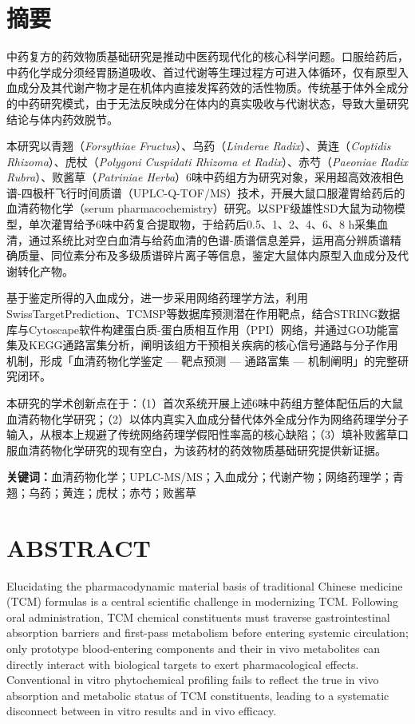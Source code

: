 \documentclass[12pt,a4paper,UTF8,openany]{ctexbook}
\begin{document}
\chapter*{摘\quad 要}

中药复方的药效物质基础研究是推动中医药现代化的核心科学问题。口服给药后，中药化学成分须经胃肠道吸收、首过代谢等生理过程方可进入体循环，仅有原型入血成分及其代谢产物才是在机体内直接发挥药效的活性物质。传统基于体外全成分的中药研究模式，由于无法反映成分在体内的真实吸收与代谢状态，导致大量研究结论与体内药效脱节。

本研究以青翘（\textit{Forsythiae Fructus}）、乌药（\textit{Linderae Radix}）、黄连（\textit{Coptidis Rhizoma}）、虎杖（\textit{Polygoni Cuspidati Rhizoma et Radix}）、赤芍（\textit{Paeoniae Radix Rubra}）、败酱草（\textit{Patriniae Herba}）6味中药组方为研究对象，采用超高效液相色谱-四极杆飞行时间质谱（UPLC-Q-TOF/MS）技术，开展大鼠口服灌胃给药后的血清药物化学（serum pharmacochemistry）研究。以SPF级雄性SD大鼠为动物模型，单次灌胃给予6味中药复合提取物，于给药后0.5、1、2、4、6、8 h采集血清，通过系统比对空白血清与给药血清的色谱-质谱信息差异，运用高分辨质谱精确质量、同位素分布及多级质谱碎片离子等信息，鉴定大鼠体内原型入血成分及代谢转化产物。

基于鉴定所得的入血成分，进一步采用网络药理学方法，利用SwissTargetPrediction、TCMSP等数据库预测潜在作用靶点，结合STRING数据库与Cytoscape软件构建蛋白质-蛋白质相互作用（PPI）网络，并通过GO功能富集及KEGG通路富集分析，阐明该组方干预相关疾病的核心信号通路与分子作用机制，形成「血清药物化学鉴定 — 靶点预测 — 通路富集 — 机制阐明」的完整研究闭环。

本研究的学术创新点在于：（1）首次系统开展上述6味中药组方整体配伍后的大鼠血清药物化学研究；（2）以体内真实入血成分替代体外全成分作为网络药理学分子输入，从根本上规避了传统网络药理学假阳性率高的核心缺陷；（3）填补败酱草口服血清药物化学研究的现有空白，为该药材的药效物质基础研究提供新证据。

\vspace{1em}
\noindent\textbf{关键词：}血清药物化学；UPLC-MS/MS；入血成分；代谢产物；网络药理学；青翘；乌药；黄连；虎杖；赤芍；败酱草

\chapter*{ABSTRACT}

Elucidating the pharmacodynamic material basis of traditional Chinese medicine (TCM) formulas is a central scientific challenge in modernizing TCM. Following oral administration, TCM chemical constituents must traverse gastrointestinal absorption barriers and first-pass metabolism before entering systemic circulation; only prototype blood-entering components and their in vivo metabolites can directly interact with biological targets to exert pharmacological effects. Conventional in vitro phytochemical profiling fails to reflect the true in vivo absorption and metabolic status of TCM constituents, leading to a systematic disconnect between in vitro results and in vivo efficacy.
\end{document}
